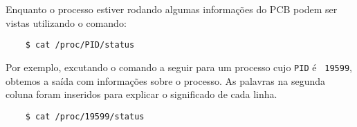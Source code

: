 
% 
Enquanto o processo estiver rodando algumas informações do PCB podem ser vistas
utilizando o comando:

\begin{verbatim}
    $ cat /proc/PID/status
\end{verbatim}


Por exemplo, excutando o comando a seguir para um processo cujo {\tt PID} é {\tt
  19599}, obtemos a saída com informações sobre o processo. As palavras na
segunda coluna foram inseridos para explicar o significado de cada linha.\\

\begin{verbatim}
    $ cat /proc/19599/status
\end{verbatim}

